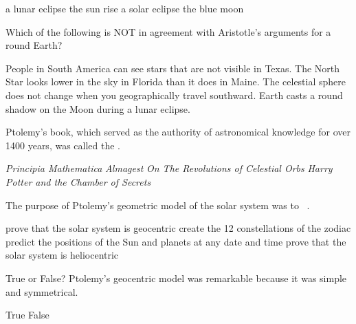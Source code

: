 \documentclass[addpoints]{exam}
\begin{document}
\begin{questions}
\begin{choices}
    \choice a lunar eclipse
    \choice the sun rise
    \correctchoice a solar eclipse
    \choice the blue moon
\end{choices}

\question
Which of the following is NOT in agreement with Aristotle's arguments for a round Earth?

\begin{choices}
    \choice People in South America can see stars that are not visible in Texas.
    \choice The North Star looks lower in the sky in Florida than it does in Maine.
    \correctchoice The celestial sphere does not change when you geographically travel southward. 
    \choice Earth casts a round shadow on the Moon during a lunar eclipse.
\end{choices}



\question
Ptolemy's book, which served as the authority of astronomical knowledge for over 1400 years, was called the .

\begin{choices}
    \choice \textit{Principia Mathematica}
    \correctchoice \textit{Almagest}
    \choice \textit{On The Revolutions of Celestial Orbs}
    \choice \textit{Harry Potter and the Chamber of Secrets}
\end{choices}

\question
The purpose of Ptolemy's geometric model of the solar system was to \fillin\ .

\begin{choices}
    \choice prove that the solar system is geocentric
    \choice create the 12 constellations of the zodiac
    \correctchoice predict the positions of the Sun and planets at any date and time
    \choice prove that the solar system is heliocentric
\end{choices}

\question
True or False? Ptolemy's geocentric model was remarkable because it was simple and symmetrical.

\begin{choices}
    \choice True
    \correctchoice False
\end{choices}



\end{questions}
\end{document}

